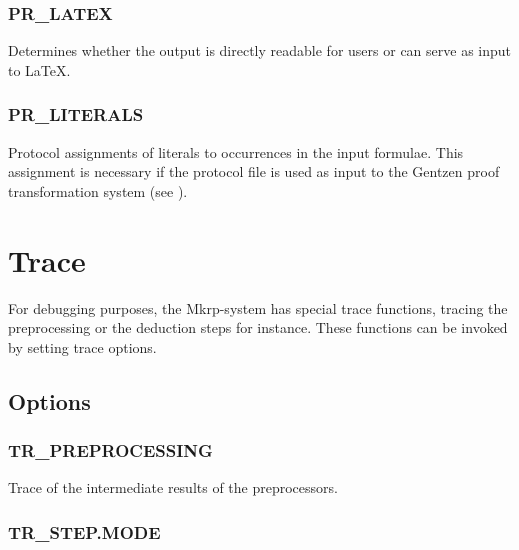 \subsubsection{PR\_LATEX}
  

Determines whether the output is directly readable for users or
can serve as input to \LaTeX.

\PO


\subsubsection{PR\_LITERALS}
  
Protocol assignments of literals to occurrences in the input
formulae. This assignment is necessary if the protocol file is used as
input to the Gentzen proof transformation system (see \cite{Lingenfelder90}).

\PO
{}



\section{Trace}

For debugging purposes, the {\sc Mkrp}-system has special trace functions, 
tracing the preprocessing or the deduction steps for instance. These 
functions can be invoked by setting trace options. 


\subsection{Options}

\subsubsection{TR\_PREPROCESSING}
  

Trace of the intermediate results of the preprocessors.

\PO
{}

\subsubsection{TR\_STEP.MODE}
  

